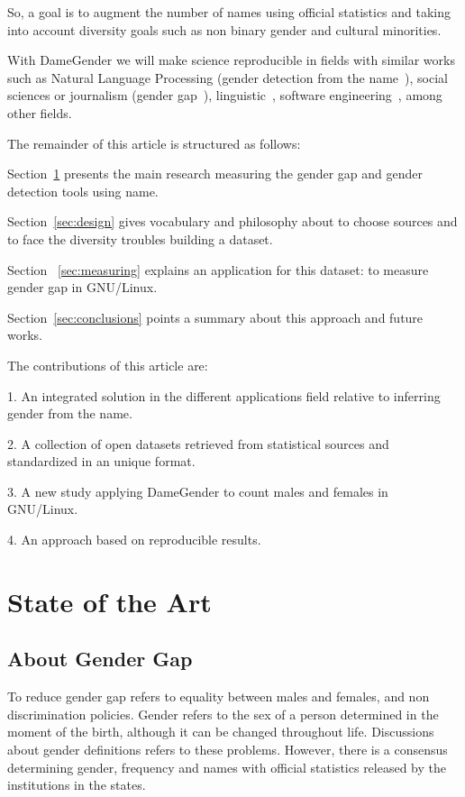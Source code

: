 \documentclass[a4paper]{article}
\begin{document}
So, a goal is to augment the number of names using official statistics
and taking into account diversity goals such as non binary gender and
cultural minorities.

With DameGender we will make science reproducible\cite{peng2011reproducible}
in fields with similar works such as Natural Language Processing
(gender detection from the name~\cite{sun2019mitigating}), social
sciences or journalism (gender
gap~\cite{holman2018gender,mislove2011understanding,niemi2017gendered,de2014genero}),
linguistic~\cite{hutson2016gender,van2020gender,okal2018linguistic},
software engineering~\cite{vasilescu2012gender}, among other fields.

The remainder of this article is structured as follows:

Section~\ref{sec:stateofart} presents the main research measuring the
gender gap and gender detection tools using name.

Section~\ref{sec:design} gives vocabulary and philosophy about to
choose sources and to face the diversity troubles building a dataset.

Section ~\ref{sec:measuring} explains an application for this
dataset: to measure gender gap in GNU/Linux.

Section~\ref{sec:conclusions} points a summary about this approach and
future works.

The contributions of this article are:

1. An integrated solution in the different applications field relative
to inferring gender from the name.

2. A collection of open datasets retrieved from statistical sources
and standardized in an unique format.

3. A new study applying DameGender to count males and females in
GNU/Linux.

4. An approach based on reproducible results.


\section{State of the Art}
\label{sec:stateofart}

\subsection{About Gender Gap}

To reduce gender gap refers to equality between males and females,
and non discrimination policies. Gender refers to the sex of a person
determined in the moment of the birth, although it can be changed
throughout life. Discussions about gender definitions refers to these
problems. However, there is a consensus determining gender, frequency
and names with official statistics released by the institutions in the
states.
\end{document}
